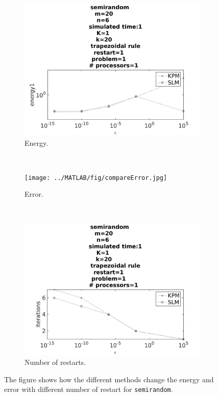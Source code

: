 \begin{figure}[H]
        \begin{subfigure}[b]{0.3\textwidth}
                \includegraphics[width=\textwidth]{../MATLAB/fig/compareEnergy.jpg}
                \caption{Energy.}
                \label{fig:compareEnergy}
        \end{subfigure}
        ~
        \begin{subfigure}[b]{0.3\textwidth}
                \texttt{[image: ../MATLAB/fig/compareError.jpg]}
                \caption{ Error. }
                \label{fig:compareError}
        \end{subfigure}
        ~
        \begin{subfigure}[b]{0.3\textwidth}
                \includegraphics[width=\textwidth]{../MATLAB/fig/compareIter.jpg}
                \caption{ Number of restarts.  }
                \label{fig:compareIter}
        \end{subfigure}
        \caption{ The figure shows how the different methods change the energy and error with different number of restart for \texttt{semirandom}.  }
        \label{fig:compare}
\end{figure}



